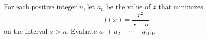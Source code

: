For each positive integer $n$, let $a_n$ be the value of $x$ that minimizes
\[
f(x)=\dfrac{x^2}{x-n}
\]
on the interval $x>n$. Evaluate $a_1+a_2+\cdots+a_{100}$.
